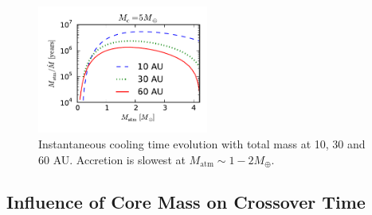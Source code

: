 \documentclass[apj]{emulateapj}
\begin{document}

\begin{figure}[h]
\centering
\includegraphics[width=0.5\textwidth]{../../figs/ModelAtmospheres/RadSelfGravPoly/PaperFigs/Mt_profile.pdf}
\caption{Instantaneous cooling time evolution with total mass at 10, 30 and 60 AU. Accretion is slowest at $M_{\mathrm{atm}} \sim 1-2 M_{\oplus}$.}
\label{fig:growthtime}
\end{figure}

\subsection{Influence of Core Mass on Crossover Time}
\label{Mct}
\end{document}
